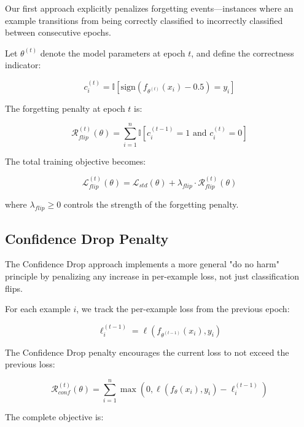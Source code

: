 \documentclass[12pt, letterpaper]{article}
\theoremstyle{remark}
\begin{document}
Our first approach explicitly penalizes forgetting events—instances where an example transitions from being correctly classified to incorrectly classified between consecutive epochs.

Let $\theta^{(t)}$ denote the model parameters at epoch $t$, and define the correctness indicator:

\begin{equation}
c_i^{(t)} = \mathbb{I}[\text{sign}(f_{\theta^{(t)}}(x_i) - 0.5) = y_i]
\end{equation}

The forgetting penalty at epoch $t$ is:

\begin{equation}
\mathcal{R}_{flip}^{(t)}(\theta) = \sum_{i=1}^n \mathbb{I}[c_i^{(t-1)} = 1 \text{ and } c_i^{(t)} = 0]
\end{equation}

The total training objective becomes:

\begin{equation}
\mathcal{L}_{flip}^{(t)}(\theta) = \mathcal{L}_{std}(\theta) + \lambda_{flip} \cdot \mathcal{R}_{flip}^{(t)}(\theta)
\end{equation}

where $\lambda_{flip} \geq 0$ controls the strength of the forgetting penalty.

\subsection{Confidence Drop Penalty}

The Confidence Drop approach implements a more general "do no harm" principle by penalizing any increase in per-example loss, not just classification flips.

For each example $i$, we track the per-example loss from the previous epoch:

\begin{equation}
\ell_i^{(t-1)} = \ell(f_{\theta^{(t-1)}}(x_i), y_i)
\end{equation}

The Confidence Drop penalty encourages the current loss to not exceed the previous loss:

\begin{equation}
\mathcal{R}_{conf}^{(t)}(\theta) = \sum_{i=1}^n \max(0, \ell(f_\theta(x_i), y_i) - \ell_i^{(t-1)})
\end{equation}

The complete objective is:
\end{document}
